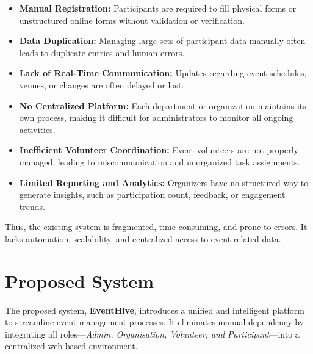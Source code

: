 \documentclass[12pt,a4paper]{report}
\begin{document}
\begin{itemize}
    \item \textbf{Manual Registration:} Participants are required to fill physical forms or unstructured online forms without validation or verification.
    \item \textbf{Data Duplication:} Managing large sets of participant data manually often leads to duplicate entries and human errors.
    \item \textbf{Lack of Real-Time Communication:} Updates regarding event schedules, venues, or changes are often delayed or lost.
    \item \textbf{No Centralized Platform:} Each department or organization maintains its own process, making it difficult for administrators to monitor all ongoing activities.
    \item \textbf{Inefficient Volunteer Coordination:} Event volunteers are not properly managed, leading to miscommunication and unorganized task assignments.
    \item \textbf{Limited Reporting and Analytics:} Organizers have no structured way to generate insights, such as participation count, feedback, or engagement trends.
\end{itemize}

Thus, the existing system is fragmented, time-consuming, and prone to errors. It lacks automation, scalability, and centralized access to event-related data.

\section{Proposed System}

The proposed system, \textbf{EventHive}, introduces a unified and intelligent platform to streamline event management processes. It eliminates manual dependency by integrating all roles—\textit{Admin, Organisation, Volunteer, and Participant}—into a centralized web-based environment.
\end{document}
